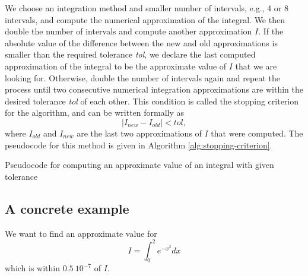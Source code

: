 We choose an integration method and smaller number of intervals, e.g., 4 or 8
    intervals, and compute the numerical approximation of the integral.
We then double the number of intervals and compute another approximation $ I $.
If the absolute value of the difference between the new and old approximations
    is smaller than the required tolerance \textit{tol}, we declare the last
    computed approximation of the integral to be the approximate value of $ I $
    that we are looking for.
Otherwise, double the number of intervals again and repeat the process until two
    consecutive numerical integration approximations are within the desired
    tolerance \textit{tol} of each other.
This condition is called the stopping criterion for the algorithm, and can be
    written formally as
\begin{equation}
    \lvert I_{new} - I_{old} \rvert < tol,
    \label{eq:stopping-criterion}
\end{equation}
where $ I_{old} $ and $ I_{new} $ are the last two approximations of $ I $ that
    were computed.
The pseudocode for this method is given in Algorithm
    \ref{alg:stopping-criterion}.
\begin{algorithm}
    \caption{Pseudocode for computing an approximate value of an integral with
        given tolerance}
    \label{alg:stopping-criterion}
    \begin{algorithmic}

        \State{}


        \State{}

        \EndWhile
    \end{algorithmic}
\end{algorithm}

\subsection{A concrete example}
We want to find an approximate value for
\begin{equation*}
    I = \int_{0}^{2} e^{-x^2} dx
\end{equation*}
which is within $ 0.5\ 10^{-7} $ of $ I $.

